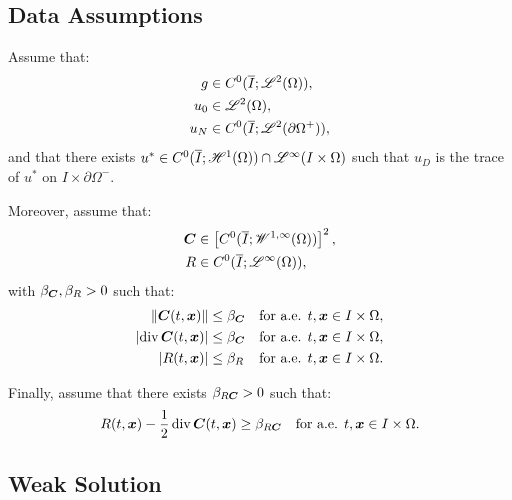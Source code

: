 \subsection{Data Assumptions} \label{assumptions}

Assume that:
\begin{align}
    g & \in C^0(\overline{I}; \mathscr{L}^{2}(\Omega)), \label{equation:ass_1} \\
    u_0 & \in \mathscr{L}^{2}(\Omega), \label{equation:ass_2} \\
    u_N & \in C^0(\overline{I}; \mathscr{L}^{2}(\partial \Omega^+)), \label{equation:ass_3}
\end{align}
and that there exists $u^* \in C^0(\overline{I}; \mathscr{H}^{1}(\Omega)) \cap \mathscr{L}^{\infty}(I \times \Omega)$ such that $u_D$ is the trace of $u^*$ on $I \times \partial \Omega^-$.

Moreover, assume that:
\begin{align}
    \bm{C} & \in \left[ C^0(\overline{I}; \mathscr{W}^{1, \infty}(\Omega)) \right]^2, \label{equation:ass_4} \\
    R & \in C^0(\overline{I}; \mathscr{L}^{\infty}(\Omega)), \label{equation:ass_5}
\end{align}
with $\beta_{\bm{C}}, \beta_{R} > 0$ such that:
\begin{align}
    \left\lVert \bm{C}(t, \bm{x}) \right\rVert & \leq \beta_{\bm{C}} &\text{for a.e. } t, \bm{x} \in I \times \Omega, \label{equation:ass_6} \\
    \left\lvert \operatorname*{div} \bm{C}(t, \bm{x}) \right\rvert & \leq \beta_{\bm{C}} &\text{for a.e. } t, \bm{x} \in I \times \Omega, \label{equation:ass_7} \\
    \left\lvert R(t, \bm{x}) \right\rvert & \leq \beta_{R} &\text{for a.e. } t, \bm{x} \in I \times \Omega. \label{equation:ass_8}
\end{align}

Finally, assume that there exists $\beta_{R \bm{C}} > 0$ such that:
\begin{align}
    R(t, \bm{x}) - \frac{1}{2} \operatorname*{div} \bm{C}(t, \bm{x}) & \geq \beta_{R \bm{C}} &\text{for a.e. } t, \bm{x} \in I \times \Omega. \label{equation:ass_9}
\end{align}

\newpage
\subsection{Weak Solution}

